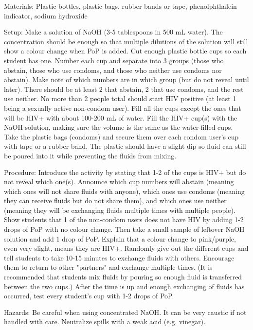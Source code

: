 \begin{multicols}{2}
\begin{description*}
\item[Materials:]{Plastic bottles, plastic bags, rubber bands or tape, phenolphthalein indicator, sodium hydroxide}
\item[Setup:]{Make a solution of NaOH (3-5 tablespoons in 500 mL water). The concentration should be enough so that multiple dilutions of the solution will still show a colour change when PoP is added. Cut enough plastic bottle cups so each student has one. Number each cup and separate into 3 groups (those who abstain, those who use condoms, and those who neither use condoms nor abstain). Make note of which numbers are in which group (but do not reveal until later). There should be at least 2 that abstain, 2 that use condoms, and the rest use neither. No more than 2 people total should start HIV positive (at least 1 being a sexually active non-condom user). Fill all the cups except the ones that will be HIV+ with about 100-200 mL of water. Fill the HIV+ cup(s) with the NaOH solution, making sure the volume is the same as the water-filled cups. Take the plastic bags (condoms) and secure them over each condom user's cup with tape or a rubber band. The plastic should have a slight dip so fluid can still be poured into it while preventing the fluids from mixing.}
\item[Procedure:]{Introduce the activity by stating that 1-2 of the cups is HIV+ but do not reveal which one(s). Announce which cup numbers will abstain (meaning which ones will not share fluids with anyone), which ones use condoms (meaning they can receive fluids but do not share them), and which ones use neither (meaning they will be exchanging fluids multiple times with multiple people). Show students that 1 of the non-condom users does not have HIV by adding 1-2 drops of PoP with no colour change. Then take a small sample of leftover NaOH solution and add 1 drop of PoP. Explain that a colour change to pink/purple, even very slight, means they are HIV+. Randomly give out the different cups and tell students to take 10-15 minutes to exchange fluids with others. Encourage them to return to other "partners" and exchange multiple times. (It is recommended that students mix fluids by pouring so enough fluid is transferred between the two cups.) After the time is up and enough exchanging of fluids has occurred, test every student's cup with 1-2 drops of PoP.}
\item[Hazards:]{Be careful when using concentrated NaOH. It can be very caustic if not handled with care. Neutralize spills with a weak acid (e.g. vinegar).}

\end{description*}
\end{multicols}
